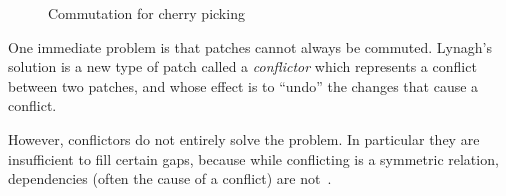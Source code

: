 \begin{figure}
\begin{center}
\end{center}
\caption{Commutation for cherry picking}
\label{fig:darcs-cherry-pick}
\end{figure}

One immediate problem is that patches cannot always be commuted. Lynagh's
solution is a new type of patch called a \emph{conflictor} which represents a
conflict between two patches, and whose effect is to ``undo'' the changes that
cause a conflict.

However, conflictors do not entirely solve the problem. In particular they are
insufficient to fill certain gaps, because while conflicting is a symmetric
relation, dependencies (often the cause of a conflict) are not~\cite{DarcsConflictors}.